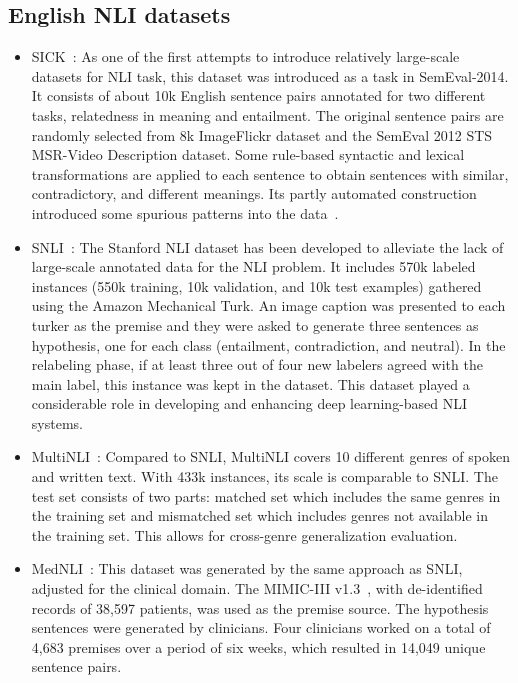 \documentclass[preprint,12pt]{elsarticle}
\begin{document}
\subsection{English NLI datasets}
\begin{itemize}
    \item SICK~\citep{marelli2014semeval}: As one of the first attempts to introduce relatively large-scale datasets for NLI task, this dataset was introduced as a task in SemEval-2014. It consists of about 10k English sentence pairs annotated for two different tasks, relatedness in meaning and entailment. The original sentence pairs are randomly selected from 8k ImageFlickr dataset and the SemEval 2012 STS MSR-Video Description dataset. Some rule-based syntactic and lexical transformations are applied to each sentence to obtain sentences with similar, contradictory, and different meanings. Its partly automated construction introduced some spurious patterns into the data~\citep{bowman2015large}. 
    \item SNLI~\citep{bowman2015large}: The Stanford NLI dataset has been developed to alleviate the lack of large-scale annotated data for the NLI problem. It includes 570k labeled instances (550k training, 10k validation, and 10k test examples) gathered using the Amazon Mechanical Turk. An image caption was presented to each turker as the premise and they were asked to generate three sentences as hypothesis, one for each class (entailment, contradiction, and neutral). In the relabeling phase, if at least three out of four new labelers agreed with the main label, this instance was kept in the dataset. This dataset played a considerable role in developing and enhancing deep learning-based NLI systems.  
    \item MultiNLI~\citep{williams2017broad}: Compared to SNLI, MultiNLI covers 10 different genres of spoken and written text. With 433k instances, its scale is comparable to SNLI. The test set consists of two parts: matched set which includes the same genres in the training set and mismatched set which includes genres not available in the training set. This allows for cross-genre generalization evaluation. 
    \item MedNLI~\citep{romanov2018lessons}: This dataset was generated by the same approach as SNLI, adjusted for the clinical domain. The MIMIC-III v1.3~\citep{johnson2016mimic}, with de-identified records of 38,597 patients, was used as the premise source. The hypothesis sentences were generated by clinicians. Four clinicians worked on a total of 4,683 premises over a period of six weeks, which resulted in 14,049 unique sentence pairs. 

\end{itemize}
\end{document}
